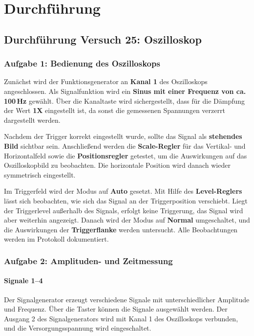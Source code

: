 \chapter{Durchführung}

\section{Durchführung Versuch 25: Oszilloskop}

\subsection{Aufgabe 1: Bedienung des Oszilloskops}
Zunächst wird der Funktionsgenerator an \textbf{Kanal 1} des Oszilloskops angeschlossen. Als Signalfunktion wird ein \textbf{Sinus mit einer Frequenz von ca. 100\,Hz} gewählt. Über die Kanaltaste wird sichergestellt, dass für die Dämpfung der Wert \textbf{1X} eingestellt ist, da sonst die gemessenen Spannungen verzerrt dargestellt werden.

Nachdem der Trigger korrekt eingestellt wurde, sollte das Signal als \textbf{stehendes Bild} sichtbar sein. Anschließend werden die \textbf{Scale-Regler} für das Vertikal- und Horizontalfeld sowie die \textbf{Positionsregler} getestet, um die Auswirkungen auf das Oszilloskopbild zu beobachten. Die horizontale Position wird danach wieder symmetrisch eingestellt.

Im Triggerfeld wird der Modus auf \textbf{Auto} gesetzt. Mit Hilfe des \textbf{Level-Reglers} lässt sich beobachten, wie sich das Signal an der Triggerposition verschiebt. Liegt der Triggerlevel außerhalb des Signals, erfolgt keine Triggerung, das Signal wird aber weiterhin angezeigt. Danach wird der Modus auf \textbf{Normal} umgeschaltet, und die Auswirkungen der \textbf{Triggerflanke} werden untersucht. Alle Beobachtungen werden im Protokoll dokumentiert.

\subsection{Aufgabe 2: Amplituden- und Zeitmessung}

\subsubsection{Signale 1–4}
Der Signalgenerator erzeugt verschiedene Signale mit unterschiedlicher Amplitude und Frequenz. Über die Taster können die Signale ausgewählt werden. Der Ausgang 2 des Signalgenerators wird mit Kanal 1 des Oszilloskops verbunden, und die Versorgungsspannung wird eingeschaltet.

